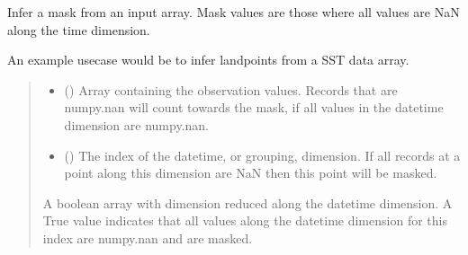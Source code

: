 \documentclass[letterpaper,10pt,english]{sphinxmanual}
\begin{document}
\begin{fulllineitems}
\label{\detokenize{misc:glomar_gridding.mask.mask_from_obs_array}}
\pysigstartsignatures
\pysiglinewithargsret
{}
{\sphinxparamcomma {}}
{}
\pysigstopsignatures
\sphinxAtStartPar
Infer a mask from an input array. Mask values are those where all values
are NaN along the time dimension.

\sphinxAtStartPar
An example use\sphinxhyphen{}case would be to infer land\sphinxhyphen{}points from a SST data array.
\begin{quote}\begin{description}
\begin{itemize}
\item {}
\sphinxAtStartPar
{} () \textendash{} Array containing the observation values. Records that are numpy.nan
will count towards the mask, if all values in the datetime dimension
are numpy.nan.

\item {}
\sphinxAtStartPar
{} () \textendash{} The index of the datetime, or grouping, dimension. If all records at
a point along this dimension are NaN then this point will be masked.

\end{itemize}

\sphinxAtStartPar
{} \textendash{} A boolean array with dimension reduced along the datetime dimension.
A True value indicates that all values along the datetime dimension
for this index are numpy.nan and are masked.

\sphinxAtStartPar
{}

\end{description}\end{quote}

\end{fulllineitems}

\end{document}

